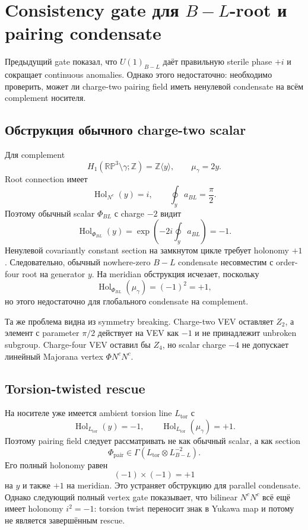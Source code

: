 \chapter{Consistency gate для
\texorpdfstring{\(B-L\)}{B-L}-root и pairing condensate}

Предыдущий gate показал, что \(U(1)_{B-L}\) даёт правильную sterile phase
\(+i\) и сокращает continuous anomalies. Однако этого недостаточно:
необходимо проверить, может ли charge-two pairing field иметь ненулевой
condensate на всём complement носителя.

\section{Обструкция обычного charge-two scalar}

Для complement
\[
 H_1(\mathbb{RP}^3\setminus\gamma;\mathbb Z)=\mathbb Z\langle y\rangle,
 \qquad \mu_\gamma=2y.
\]
Root connection имеет
\[
 \operatorname{Hol}_{N^c}(y)=i,
 \qquad
 \oint_y a_{BL}=\frac{\pi}{2}.
\]
Поэтому обычный scalar \(\Phi_{BL}\) с charge \(-2\) видит
\[
 \operatorname{Hol}_{\Phi_{BL}}(y)
 =\exp\left(-2i\oint_y a_{BL}\right)=-1.
\]
Ненулевой covariantly constant section на замкнутом цикле требует
holonomy \(+1\). Следовательно, обычный nowhere-zero \(B-L\) condensate
несовместим с order-four root на generator \(y\). На meridian обструкция
исчезает, поскольку
\[
 \operatorname{Hol}_{\Phi_{BL}}(\mu_\gamma)=(-1)^2=+1,
\]
но этого недостаточно для глобального condensate на complement.

Та же проблема видна из symmetry breaking. Charge-two VEV оставляет
\(Z_2\), а элемент с parameter \(\pi/2\) действует на VEV как \(-1\) и не
принадлежит unbroken subgroup. Charge-four VEV оставил бы \(Z_4\), но scalar
charge \(-4\) не допускает линейный Majorana vertex
\(\Phi N^cN^c\).

\section{Torsion-twisted rescue}

На носителе уже имеется ambient torsion line \(L_{\mathrm{tor}}\) с
\[
 \operatorname{Hol}_{L_{\mathrm{tor}}}(y)=-1,
 \qquad
 \operatorname{Hol}_{L_{\mathrm{tor}}}(\mu_\gamma)=+1.
\]
Поэтому pairing field следует рассматривать не как обычный scalar, а как
section
\begin{equation}
 \Phi_{\mathrm{pair}}\in
 \Gamma\!\left(
 L_{\mathrm{tor}}\otimes L_{B-L}^{-2}
 \right).
\end{equation}
Его полный holonomy равен
\[
 (-1)\times(-1)=+1
\]
на \(y\) и также \(+1\) на meridian. Это устраняет обструкцию для
parallel condensate. Однако следующий полный vertex gate показывает, что
bilinear \(N^cN^c\) всё ещё имеет holonomy \(i^2=-1\): torsion twist
переносит знак в Yukawa map и потому не является завершённым rescue.

